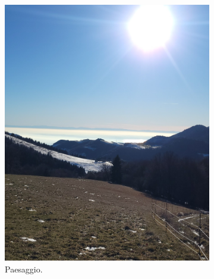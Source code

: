 \documentclass{article}
\begin{document}
\begin{figure}[htbp!]
    \begin{subfigure}{0.45\textwidth}
        \centering
        \includegraphics[width=\linewidth]{images/foto_paesaggio.jpg}
        \caption{Paesaggio.}
        \label{fig:foto3}
    \end{subfigure}
    \hfill 
    \begin{subfigure}{0.45\textwidth}
        \centering

\end{subfigure}
\end{figure}
\end{document}
